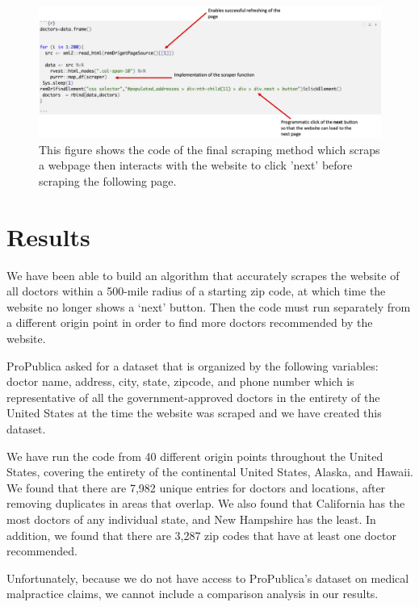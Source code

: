 \documentclass[10pt,letterpaper]{article}
\begin{document}
\begin{figure}
\includegraphics[width=1\linewidth]{final_scrape} \caption{This figure shows the code of the final scraping method which scraps a webpage then interacts with the website to click 'next' before scraping the following page.}\label{fig:unnamed-chunk-4}
\end{figure}

\section{Results}\label{results}

We have been able to build an algorithm that accurately scrapes the
website of all doctors within a 500-mile radius of a starting zip code,
at which time the website no longer shows a `next' button. Then the code
must run separately from a different origin point in order to find more
doctors recommended by the website.

ProPublica asked for a dataset that is organized by the following
variables: doctor name, address, city, state, zipcode, and phone number
which is representative of all the government-approved doctors in the
entirety of the United States at the time the website was scraped and we
have created this dataset.

We have run the code from 40 different origin points throughout the
United States, covering the entirety of the continental United States,
Alaska, and Hawaii. We found that there are 7,982 unique entries for
doctors and locations, after removing duplicates in areas that overlap.
We also found that California has the most doctors of any individual
state, and New Hampshire has the least. In addition, we found that there
are 3,287 zip codes that have at least one doctor recommended.

Unfortunately, because we do not have access to ProPublica's dataset on
medical malpractice claims, we cannot include a comparison analysis in
our results.
\end{document}
